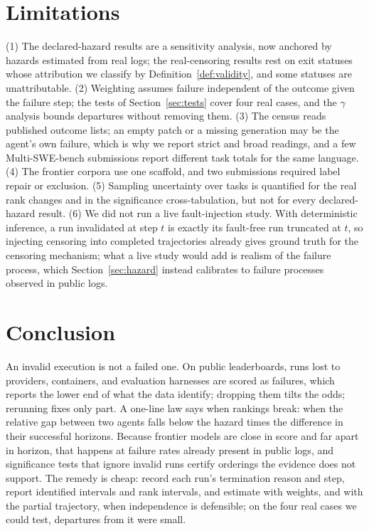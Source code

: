 \documentclass[11pt]{article}
\theoremstyle{definition}
\theoremstyle{remark}
\begin{document}
\section{Limitations}

(1) The declared-hazard results are a sensitivity analysis, now anchored by
hazards estimated from real logs; the real-censoring results rest on exit
statuses whose attribution we classify by Definition~\ref{def:validity}, and some
statuses are unattributable. (2) Weighting assumes failure independent of the
outcome given the failure step; the tests of Section~\ref{sec:tests} cover four
real cases, and the $\gamma$ analysis bounds departures without removing them.
(3) The census reads published outcome lists; an empty patch or a missing
generation may be the agent's own failure, which is why we report strict and
broad readings, and a few Multi-SWE-bench submissions report different task
totals for the same language. (4) The frontier corpora use one scaffold, and two
submissions required label repair or exclusion. (5) Sampling uncertainty over
tasks is quantified for the real rank changes and in the significance
cross-tabulation, but not for every declared-hazard result. (6) We did not run a
live fault-injection study. With deterministic inference, a run invalidated at
step $t$ is exactly its fault-free run truncated at $t$, so injecting censoring
into completed trajectories already gives ground truth for the censoring
mechanism; what a live study would add is realism of the failure process, which
Section~\ref{sec:hazard} instead calibrates to failure processes observed in
public logs.

\section{Conclusion}

An invalid execution is not a failed one. On public leaderboards, runs lost to
providers, containers, and evaluation harnesses are scored as failures, which
reports the lower end of what the data identify; dropping them tilts the odds;
rerunning fixes only part. A one-line law says when rankings break: when the
relative gap between two agents falls below the hazard times the difference in
their successful horizons. Because frontier models are close in score and far
apart in horizon, that happens at failure rates already present in public logs,
and significance tests that ignore invalid runs certify orderings the evidence
does not support. The remedy is cheap: record each run's termination reason and
step, report identified intervals and rank intervals, and estimate with weights,
and with the partial trajectory, when independence is defensible; on the four
real cases we could test, departures from it were small.
\end{document}
